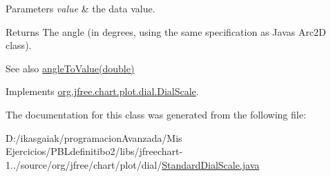 \begin{DoxyParams}{Parameters}
{\em value} & the data value.\\
\hline
\end{DoxyParams}
\begin{DoxyReturn}{Returns}
The angle (in degrees, using the same specification as Java\textquotesingle{}s Arc2D class).
\end{DoxyReturn}
\begin{DoxySeeAlso}{See also}
\mbox{\hyperlink{classorg_1_1jfree_1_1chart_1_1plot_1_1dial_1_1_standard_dial_scale_a0fadcd7cb0f8a32db1fa1cc3add12a35}{angle\+To\+Value(double)}} 
\end{DoxySeeAlso}


Implements \mbox{\hyperlink{interfaceorg_1_1jfree_1_1chart_1_1plot_1_1dial_1_1_dial_scale_a62e51ecfa46b525c6476d99e69472d9e}{org.\+jfree.\+chart.\+plot.\+dial.\+Dial\+Scale}}.



The documentation for this class was generated from the following file\+:\begin{DoxyCompactItemize}
\item 
D\+:/ikasgaiak/programacion\+Avanzada/\+Mis Ejercicios/\+P\+B\+Ldefinitibo2/libs/jfreechart-\/1../source/org/jfree/chart/plot/dial/\mbox{\hyperlink{_standard_dial_scale_8java}{Standard\+Dial\+Scale.\+java}}\end{DoxyCompactItemize}
